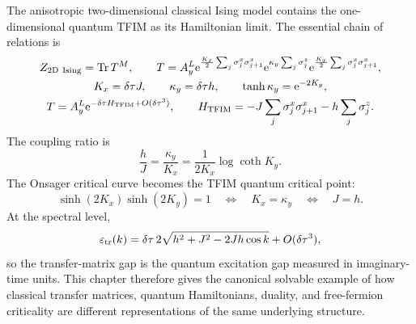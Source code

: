 The anisotropic two-dimensional classical Ising model contains the
one-dimensional quantum TFIM as its Hamiltonian limit.  The essential chain of
relations is
\begin{equation}
\label{eq:ising-tfim-summary-chain}
\begin{gathered}
    Z_{\rm 2D\ Ising}=\operatorname{Tr} T^M,
    \qquad
    T
    =
    A_y^L
    \mathrm{e}^{\frac{K_x}{2}\sum_j\sigma_j^x\sigma_{j+1}^x}
    \mathrm{e}^{\kappa_y\sum_j\sigma_j^z}
    \mathrm{e}^{\frac{K_x}{2}\sum_j\sigma_j^x\sigma_{j+1}^x},
    \\
    K_x=\delta\tau J,
    \qquad
    \kappa_y=\delta\tau h,
    \qquad
    \tanh\kappa_y=\mathrm{e}^{-2K_y},
    \\
    T
    =
    A_y^L\mathrm{e}^{-\delta\tau H_{\rm TFIM}+O(\delta\tau^3)},
    \qquad
    H_{\rm TFIM}
    =
    -J\sum_j\sigma_j^x\sigma_{j+1}^x
    -h\sum_j\sigma_j^z .
\end{gathered}
\end{equation}
The coupling ratio is
\begin{equation}
\label{eq:ising-tfim-summary-ratio}
    \frac{h}{J}
    =
    \frac{\kappa_y}{K_x}
    =
    \frac{1}{2K_x}\log\coth K_y .
\end{equation}
The Onsager critical curve becomes the TFIM quantum critical point:
\begin{equation}
\label{eq:ising-tfim-summary-critical}
    \sinh(2K_x)\sinh(2K_y)=1
    \quad\Longleftrightarrow\quad
    K_x=\kappa_y
    \quad\Longleftrightarrow\quad
    J=h .
\end{equation}
At the spectral level,
\begin{equation}
\label{eq:ising-tfim-summary-dispersion}
    \varepsilon_{\rm tr}(k)
    =
    \delta\tau\,2\sqrt{h^2+J^2-2Jh\cos k}
    +O(\delta\tau^3),
\end{equation}
so the transfer-matrix gap is the quantum excitation gap measured in imaginary-
time units.  This chapter therefore gives the canonical solvable example of how
classical transfer matrices, quantum Hamiltonians, duality, and free-fermion
criticality are different representations of the same underlying structure.
